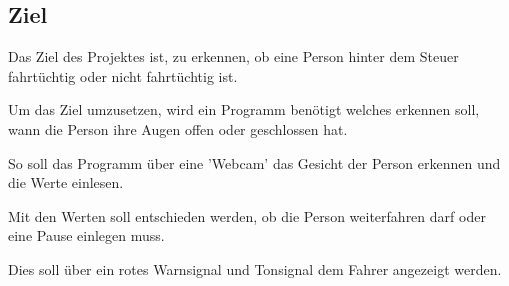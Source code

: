 \subsection{Ziel}
Das Ziel des Projektes ist, zu erkennen, ob eine Person hinter dem Steuer fahrtüchtig oder nicht fahrtüchtig ist. 

Um das Ziel umzusetzen, wird ein Programm benötigt welches erkennen soll, wann die Person ihre Augen offen oder geschlossen hat.

So soll das Programm über eine 'Webcam' das Gesicht der Person erkennen und die Werte einlesen.

Mit den Werten soll entschieden werden, ob die Person weiterfahren darf oder eine Pause einlegen muss.

Dies soll über ein rotes Warnsignal und Tonsignal dem Fahrer angezeigt werden.
\newline
\newline